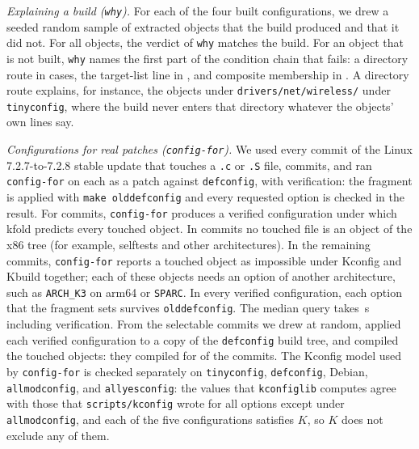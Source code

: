 \documentclass[acmsmall]{acmart}
\newcommand{\tool}{\textsf{kfold}\xspace}
\begin{document}
\emph{Explaining a build (\texttt{why}).} For each of the four built configurations, we drew a seeded random sample of \NWhyPerSide extracted objects that the build produced and \NWhyPerSide that it did not.
For all \NWhyCases objects, the verdict of \texttt{why} matches the build.
For an object that is not built, \texttt{why} names the first part of the condition chain that fails: a directory route in \NWhyFailDirectoryRoute cases, the target-list line in \NWhyFailTargetListLine, and composite membership in \NWhyFailCompositeMembership.
A directory route explains, for instance, the objects under \texttt{drivers/net/wireless/} under \texttt{tinyconfig}, where the build never enters that directory whatever the objects' own lines say.

\emph{Configurations for real patches (\texttt{config-for}).} We used every commit of the Linux 7.2.7-to-7.2.8 stable update that touches a \texttt{.c} or \texttt{.S} file, \NConfigforCommits commits, and ran \texttt{config-for} on each as a patch against \texttt{defconfig}, with verification: the fragment is applied with \texttt{make olddefconfig} and every requested option is checked in the result.
For \NConfigforSelectable commits, \texttt{config-for} produces a verified configuration under which \tool predicts every touched object.
In \NConfigforUnmapped commits no touched file is an object of the x86 tree (for example, selftests and other architectures).
In the remaining \NConfigforExcluded commits, \texttt{config-for} reports a touched object as impossible under Kconfig and Kbuild together; each of these objects needs an option of another architecture, such as \texttt{ARCH\_K3} on arm64 or \texttt{SPARC}.
In every verified configuration, each option that the fragment sets survives \texttt{olddefconfig}.
The median query takes \NConfigforMedianSeconds\,s including verification.
From the \NConfigforSelectable selectable commits we drew \NCompileSampled at random, applied each verified configuration to a copy of the \texttt{defconfig} build tree, and compiled the touched objects: they compiled for \NCompileOk of the \NCompileSampled commits.
The Kconfig model used by \texttt{config-for} is checked separately on \texttt{tinyconfig}, \texttt{defconfig}, Debian, \texttt{allmodconfig}, and \texttt{allyesconfig}: the values that \texttt{kconfiglib} computes agree with those that \texttt{scripts/kconfig} wrote for all \NKconfigDefined options except \NKconfigMismatches under \texttt{allmodconfig}, and each of the five configurations satisfies $K$, so $K$ does not exclude any of them.
\end{document}
